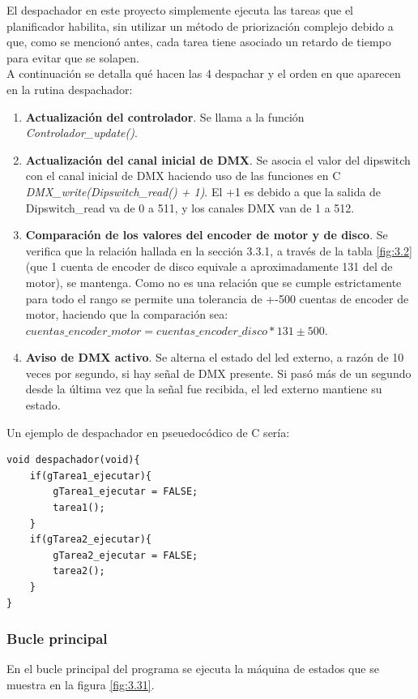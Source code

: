 El despachador en este proyecto simplemente ejecuta las tareas que el planificador habilita, sin utilizar un método de priorización complejo debido a que, como se mencionó antes, cada tarea tiene asociado un retardo de tiempo para evitar que se solapen.\\
A continuación se detalla qué hacen las 4 despachar y el orden en que aparecen en la rutina despachador:
\begin{enumerate}
	\item \textbf{Actualización del controlador}. Se llama a la función \textit{Controlador\_update()}.
	\item \textbf{Actualización del canal inicial de DMX}. Se asocia el valor del dipswitch con el canal inicial de DMX haciendo uso de las funciones en C \textit{DMX\_write(Dipswitch\_read() + 1)}. El +1 es debido a que la salida de Dipswitch\_read va de 0 a 511, y los canales DMX van de 1 a 512.
	\item \textbf{Comparación de los valores del encoder de motor y de disco}. Se verifica que la relación hallada en la sección 3.3.1, a través de la tabla \ref{fig:3.2} (que 1 cuenta de encoder de disco equivale a aproximadamente 131 del de motor), se mantenga. Como no es una relación que se cumple estrictamente para todo el rango se permite una tolerancia de +-500 cuentas de encoder de motor, haciendo que la comparación sea: \( cuentas\_encoder\_motor = cuentas\_encoder\_disco*131 \pm 500 \).
	\item \textbf{Aviso de DMX activo}. Se alterna el estado del led externo, a razón de 10 veces por segundo, si hay señal de DMX presente. Si pasó más de un segundo desde la última vez que la señal fue recibida, el led externo mantiene su estado.
\end{enumerate}
Un ejemplo de despachador en pseuedocódico de C sería:
\begin{lstlisting}[style=CStyle]
void despachador(void){
	if(gTarea1_ejecutar){
		gTarea1_ejecutar = FALSE;
		tarea1();
	}
	if(gTarea2_ejecutar){
		gTarea2_ejecutar = FALSE;
		tarea2();
	}
}
\end{lstlisting}


\subsubsection{Bucle principal}
En el bucle principal del programa se ejecuta la máquina de estados que se muestra en la figura \ref{fig:3.31}. 

